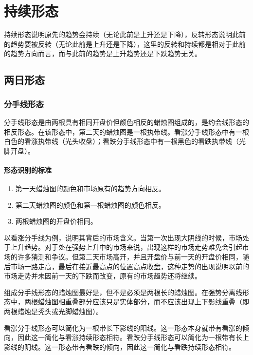 \chapter{持续形态}
持续形态说明原先的趋势会持续（无论此前是上升还是下降），反转形态说明此前的趋势要被反转（无论此前是上升还是下降），这里的反转和持续都是相对于此前的趋势方向而言，而与此前的趋势是上升趋势还是下跌趋势无关。
\section{两日形态}
\subsection{分手线形态}
分手线形态是由两根具有相同开盘价但颜色相反的蜡烛图组成的，是约会线形态的相反形态。在该形态中，第二天的蜡烛图是一根执带线。看涨分手线形态中有一根白色的看涨执带线（光头收盘）；看跌分手线形态中有一根黑色的看跌执带线（光脚开盘）。
\subsubsection*{形态识别的标准}
\begin{enumerate}
    \item 第一天蜡烛图的颜色和市场原有的趋势方向相反。
    \item 第二天蜡烛图的颜色和第一根蜡烛图的颜色相反。
    \item 两根蜡烛图的开盘价相同。
\end{enumerate}

以看涨分手线为例，说明其背后的市场含义。当第一次出现大阴线的时候，市场处于上升趋势。对于处在强势上升中的市场来说，出现这样的市场走势难免会引起市场的许多猜测和争议。但第二天市场高开，并且开盘价与前一天的开盘价相同，随后市场一路走高，最后在接近最高点的位置高点收盘，这种走势的出现说明以前的市场走势并未因前一天的下跌而改变，原有的市场趋势还将继续。

组成分手线形态的蜡烛图最好是，但不是必须是两根长的蜡烛图。在强势分离线形态中，两根蜡烛图相重叠部分应该只是实体部分，而不应该出现上下影线重叠（即两根蜡烛是秃头或光脚蜡烛图）。

看涨分手线形态可以简化为一根带长下影线的阳线。这一形态本身就带有看涨的倾向，因此这一简化与看涨持续形态相符。看跌分手线形态可以简化为一根带有长上影线的阴线。这一形态带有看跌的倾向，因此这一简化与看跌持续形态相符。


